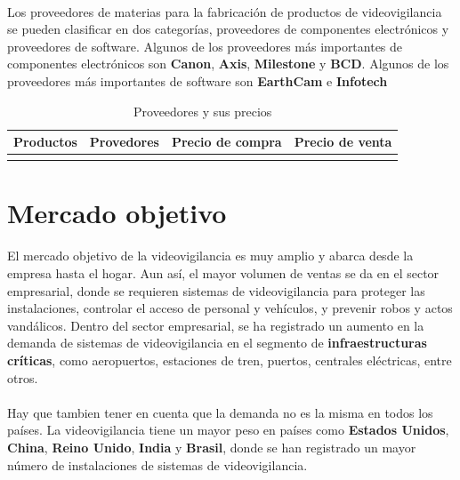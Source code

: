\documentclass{report}
\begin{document}
        \paragraph*{}
        {
          Los proveedores de materias para la fabricación de productos de videovigilancia se pueden clasificar en dos categorías, proveedores de componentes electrónicos y proveedores de software. 
          Algunos de los proveedores más importantes de componentes electrónicos son \textbf{Canon}, \textbf{Axis}, \textbf{Milestone} y \textbf{BCD}. 
          Algunos de los proveedores más importantes de software son \textbf{EarthCam} e \textbf{Infotech}
        }
        \begin{longtable}{|p{3cm}|p{3cm}|p{3.5cm}|p{3cm}|}
          \hline
          \textbf{Productos} & \textbf{Provedores} & \textbf{Precio de compra} & \textbf{Precio de venta}\\
          \hline
          
          \caption{Proveedores y sus precios}
        \end{longtable}
      \section{Mercado objetivo}  
        \paragraph*{}
        {
          El mercado objetivo de la videovigilancia es muy amplio y abarca desde la empresa hasta el hogar. 
          Aun así, el mayor volumen de ventas se da en el sector empresarial, donde se requieren sistemas de videovigilancia para proteger las instalaciones, controlar el acceso de personal y vehículos, y prevenir robos y actos vandálicos.
          Dentro del sector empresarial, se ha registrado un aumento en la demanda de sistemas de videovigilancia en el segmento de \textbf{infraestructuras críticas}, como aeropuertos, estaciones de tren, puertos, centrales eléctricas, entre otros.\cite{mordor-video-surveillance}
        }
        \paragraph*{}
        {
          Hay que tambien tener en cuenta que la demanda no es la misma en todos los países. La videovigilancia tiene un mayor peso en países como \textbf{Estados Unidos}, \textbf{China}, \textbf{Reino Unido}, \textbf{India} y \textbf{Brasil}, donde se han registrado un mayor número de instalaciones de sistemas de videovigilancia.\cite{mordor-video-surveillance}
        }
\end{document}

